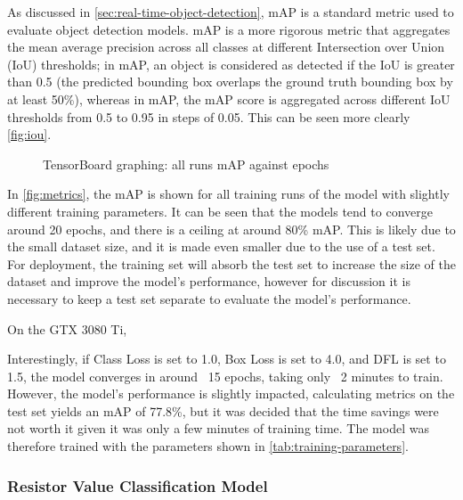 As discussed in \autoref{sec:real-time-object-detection}, mAP is a standard metric used to evaluate object detection models. mAP is a more rigorous metric that aggregates the mean average precision across all classes at different Intersection over Union (IoU) thresholds; in mAP, an object is considered as detected if the IoU is greater than 0.5 (the predicted bounding box overlaps the ground truth bounding box by at least 50\%), whereas in mAP, the mAP score is aggregated across different IoU thresholds from 0.5 to 0.95 in steps of 0.05. This can be seen more clearly \autoref{fig:iou}.
  
  \begin{figure}[H]
    \centering
     
    \caption{TensorBoard graphing: all runs mAP against epochs}
    \label{fig:metrics}
  \end{figure}
  
In \autoref{fig:metrics}, the mAP is shown for all training runs of the model with slightly different training parameters. It can be seen that the models tend to converge around 20 epochs, and there is a ceiling at around 80\% mAP. This is likely due to the small dataset size, and it is made even smaller due to the use of a test set. For deployment, the training set will absorb the test set to increase the size of the dataset and improve the model's performance, however for discussion it is necessary to keep a test set separate to evaluate the model's performance. 
  
  
  
On the GTX 3080 Ti, 
  
Interestingly, if Class Loss is set to 1.0, Box Loss is set to 4.0, and DFL is set to 1.5, the model converges in around ~15 epochs, taking only ~2 minutes to train. However, the model's performance is slightly impacted, calculating metrics on the test set yields an mAP of 77.8\%, but it was decided that the time savings were not worth it given it was only a few minutes of training time. The model was therefore trained with the parameters shown in \autoref{tab:training-parameters}.


\subsubsection{Resistor Value Classification Model}

